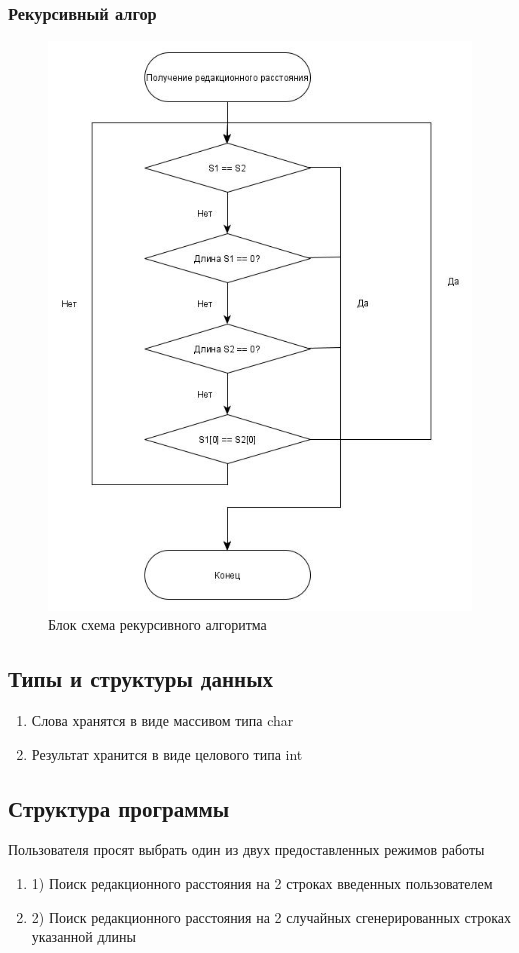\documentclass[a4paper, 14pt]{article}
\begin{document}
	\subsubsection{Рекурсивный алгор}
	\begin{figure}[]
		\centering
		\includegraphics[width=0.7\linewidth]{img/1}
		\caption{Блок схема рекурсивного алгоритма}
		\label{fig:1}
	\end{figure}
	
	
	\subsection{Типы и структуры данных}
	
	\begin{enumerate}
		\item Слова хранятся в виде массивом типа char
		\item Результат хранится в виде целового типа int

	\end{enumerate}

	\subsection{Структура программы}
	
	Пользователя просят выбрать один из двух предоставленных режимов работы
	
	\begin{enumerate}
		\item 1) Поиск редакционного расстояния на 2 строках введенных пользователем
		\item 2) Поиск редакционного расстояния на 2 случайных сгенерированных строках указанной длины
	\end{enumerate}
	
\end{document}
